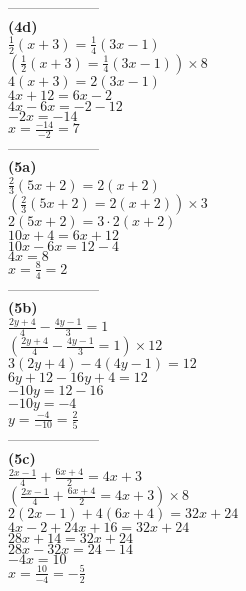 \documentclass[11pt,a4paper]{article}
\begin{document}
\begin{flushleft}
\begin{minipage}{6cm}
{\color{blue} --------------------}\\
{\bf (4d)}\\
$\frac{1}{2}(x+3)=\frac{1}{4}(3x-1)$\\
$\left( \frac{1}{2}(x+3)=\frac{1}{4}(3x-1)\right)\times 8$\\
$4(x+3)=2(3x-1)$\\
$4x+12=6x-2$\\
$4x-6x=-2-12$\\
$-2x=-14$\\
$x=\frac{-14}{-2}=7$\\
{\color{blue} --------------------}\\
{\bf (5a)}\\
$\frac{2}{3}(5x+2)=2(x+2)$\\
$\left(\frac{2}{3}(5x+2)=2(x+2)\right)\times 3$\\
$2(5x+2)=3\cdot 2(x+2)$\\
$10x+4=6x+12$\\
$10x-6x=12-4$\\
$4x=8$\\
$x=\frac{8}{4}=2$\\
{\color{blue} --------------------}\\
{\bf (5b)}\\
$\frac{2y+4}{4}-\frac{4y-1}{3}=1$\\
$\left(\frac{2y+4}{4}-\frac{4y-1}{3}=1\right)\times 12$\\
$3(2y+4)-4(4y-1)=12$\\
$6y+12-16y+4=12$\\
$-10y=12-16$\\
$-10y=-4$\\
$y=\frac{-4}{-10}=\frac{2}{5}$\\
{\color{blue} --------------------}\\
{\bf (5c)}\\
$\frac{2x-1}{4}+\frac{6x+4}{2}=4x+3$\\
$\left(\frac{2x-1}{4}+\frac{6x+4}{2}=4x+3\right)\times 8$\\
$2(2x-1)+4(6x+4)=32x+24$\\
$4x-2+24x+16=32x+24$\\
$28x+14=32x+24$\\
$28x-32x=24-14$\\
$-4x=10$\\
$x=\frac{10}{-4}=-\frac{5}{2}$\\
\end{minipage}
\end{flushleft}
\end{document}
